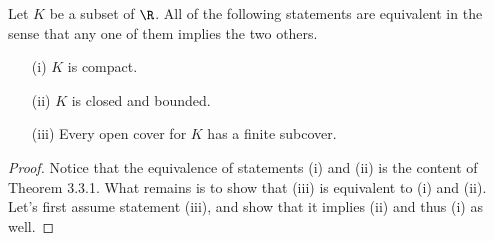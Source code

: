 \begin{tcolorbox}
\begin{thm}
Let \( K \) be a subset of \( \R \). All of the following statements are equivalent in the sense that any one of them implies the two others. 
\begin{enumerate}
    \item[(i)] \( K \) is compact.
    \item[(ii)] \( K \) is closed and bounded.
    \item[(iii)] Every open cover for \( K \) has a finite subcover.
\end{enumerate}
\end{thm}
\end{tcolorbox}

\begin{proof}
Notice that the equivalence of statements (i) and (ii) is the content of Theorem 3.3.1. What remains is to show that (iii) is equivalent to (i) and (ii). Let's first assume statement (iii), and show that it implies (ii) and thus (i) as well.
\end{proof}








